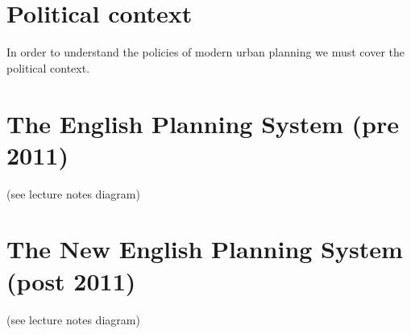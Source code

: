 \documentclass{article}
\begin{document}
	\section{Political context}
	In order to understand the policies of modern urban planning we must cover the political context.
	
	
	\section{The English Planning System (pre 2011)}
	(see lecture notes diagram)
	
	\section{The New English Planning System (post 2011)}
	(see lecture notes diagram)
	
\end{document}
